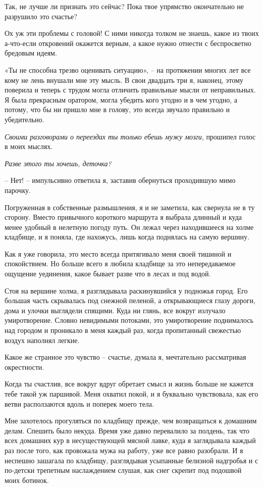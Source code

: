 \documentclass[
]{book}
\begin{document}
Так, не лучше ли признать это сейчас? Пока твое упрямство окончательно не разрушило это счастье?

Ох уж эти проблемы с головой! С ними никогда толком не знаешь, какое из твоих а-что-если откровений окажется верным, а какое нужно отнести с беспросветно бредовым идеям.

«Ты не способна трезво оценивать ситуацию», -- на протяжении многих лет все кому не лень внушали мне эту мысль. В свои двадцать три я, наконец, этому поверила и теперь с трудом могла отличить правильные мысли от неправильных. Я была прекрасным оратором, могла убедить кого угодно и в чем угодно, а потому, что бы ни пришло мне в голову, это всегда звучало правильно и убедительно.

\emph{Своими разговорами о переездах ты только ебешь мужу мозги}, прошипел голос в моих мыслях.

\emph{Разве этого ты хочешь, деточка?}

-- Нет! -- импульсивно ответила я, заставив обернуться проходившую мимо парочку.

Погруженная в собственные размышления, я и не заметила, как свернула не в ту сторону. Вместо привычного короткого маршрута я выбрала длинный и куда менее удобный в нелетную погоду путь. Он лежал через находившееся на холме кладбище, и я поняла, где нахожусь, лишь когда поднялась на самую вершину.

Как я уже говорила, это место всегда притягивало меня своей тишиной и спокойствием. Но больше всего я любила кладбище за это непередаваемое ощущение уединения, какое бывает разве что в лесах и под водой.

Стоя на вершине холма, я разглядывала раскинувшийся у подножья город. Его большая часть скрывалась под снежной пеленой, а открывающиеся глазу дороги, дома и улочки выглядели спящими. Куда ни глянь, все вокруг излучало умиротворение. Словно невидимыми потоками, это умиротворение поднималось над городом и проникало в меня каждый раз, когда пропитанный свежестью воздух наполнял легкие.

Какое же странное это чувство -- счастье, думала я, мечтательно рассматривая окрестности.

Когда ты счастлив, все вокруг вдруг обретает смысл и жизнь больше не кажется тебе такой уж паршивой. Меня охватил покой, и я буквально чувствовала, как его ветви расползаются вдоль и поперек моего тела.

Мне захотелось прогуляться по кладбищу прежде, чем возвращаться к домашним делам. Спешить было некуда. Время уже давно перевалило за полдень, так что всех домашних кур в несуществующей мясной лавке, куда я заглядывала каждый раз после того, как провожала мужа на работу, уже все равно разобрали. И я неспешно зашагала по кладбищу, разглядывая усыпанные белизной надгробья и с по-детски трепетным наслаждением слушая, как снег скрепит под подошвой моих ботинок.
\end{document}
